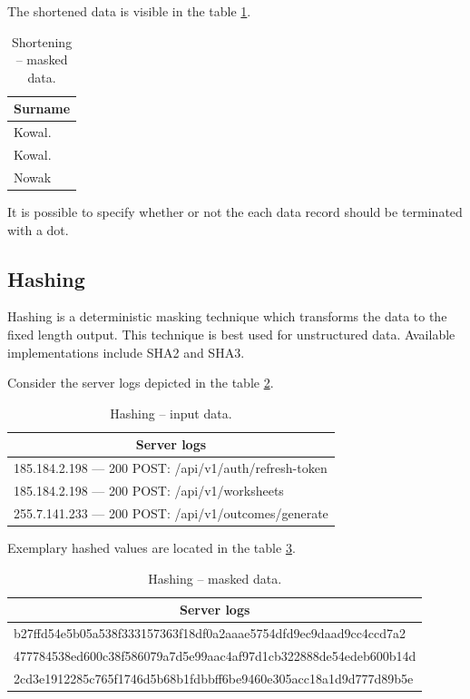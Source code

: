 \documentclass[a4paper,twoside,12pt]{book}
\begin{document}
The shortened data is visible in the table \ref{id:tab:shortening_masked}.

\begin{table}[h]
\centering
\caption{Shortening – masked data.}
\label{id:tab:shortening_masked}
\begin{tabular}{l}
\toprule
Surname    \\ \midrule
Kowal.     \\
Kowal.     \\
Nowak      \\ \bottomrule
\end{tabular}
\end{table}

It is possible to specify whether or not the each data record should be terminated with a dot.

\subsection{Hashing}

Hashing is a deterministic masking technique \cite{bib:anonymization_for_research} which transforms the data to the fixed length output. This technique is best used for unstructured data. Available implementations include SHA2 and SHA3.

Consider the server logs depicted in the table \ref{id:tab:hashing_raw}.

\begin{table}[h]
\centering
\caption{Hashing – input data.}
\label{id:tab:hashing_raw}
\begin{tabular}{l}
\toprule
\multicolumn{1}{c}{Server logs} \\ \midrule
185.184.2.198 — 200 POST: /api/v1/auth/refresh-token    \\
185.184.2.198 — 200 POST: /api/v1/worksheets \\
255.7.141.233 — 200 POST: /api/v1/outcomes/generate \\ \bottomrule
\end{tabular}
\end{table}

Exemplary hashed values are located in the table \ref{id:tab:hashing_masked}.

\begin{table}[h]
\centering
\caption{Hashing – masked data.}
\label{id:tab:hashing_masked}
\begin{tabular}{l}
\toprule
\multicolumn{1}{c}{Server logs} \\ \midrule
b27ffd54e5b05a538f333157363f18df0a2aaae5754dfd9ec9daad9cc4ccd7a2 \\
477784538ed600c38f586079a7d5e99aac4af97d1cb322888de54edeb600b14d \\
2cd3e1912285c765f1746d5b68b1fdbbff6be9460e305acc18a1d9d777d89b5e \\ \bottomrule
\end{tabular}
\end{table}
\end{document}
